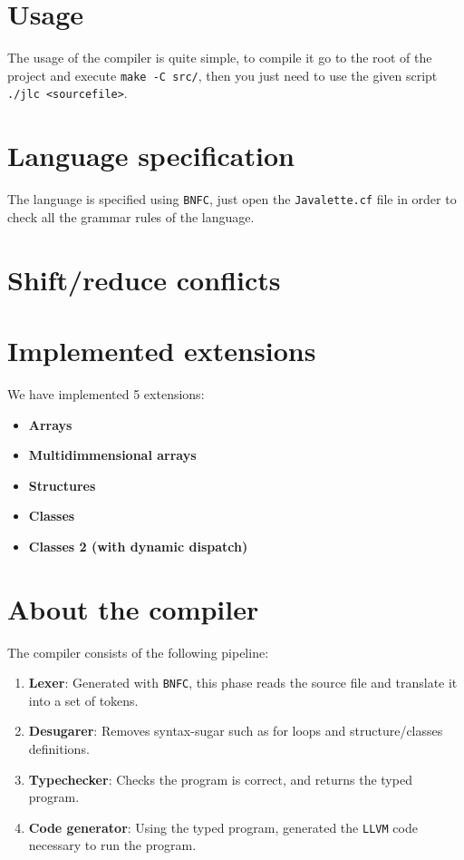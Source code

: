 \documentclass{article}
\begin{document}
\section{Usage}
The usage of the compiler is quite simple, to compile it go to the root of the project and execute \texttt{make -C src/}, then you just need to use the given script \texttt{./jlc <sourcefile>}.

\section{Language specification}
The language is specified using \texttt{BNFC}, just open the \texttt{Javalette.cf} file in order to check all the grammar rules of the language.

\section{Shift/reduce conflicts}

\section{Implemented extensions}

We have implemented 5 extensions:

\begin{itemize}
  \item {\bf Arrays}
  \item {\bf Multidimmensional arrays}
  \item {\bf Structures}
  \item {\bf Classes}
  \item {\bf Classes 2 (with dynamic dispatch)}
\end{itemize}

\section{About the compiler}

The compiler consists of the following pipeline:

\begin{enumerate}
 \item {\bf Lexer}: Generated with \texttt{BNFC}, this phase reads the source file and translate it into a set of tokens.
 \item {\bf Desugarer}: Removes syntax-sugar such as for loops and structure/classes definitions.
 \item {\bf Typechecker}: Checks the program is correct, and returns the typed program.
 \item {\bf Code generator}: Using the typed program, generated the \texttt{LLVM} code necessary to run the program.
\end{enumerate}
\end{document}
